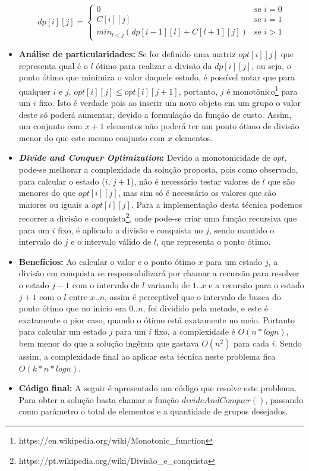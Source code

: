 \begin{itemize}
\begin{equation}
dp[i][j] =
\begin{cases}
0 &\text{se } i = 0 \\
C[i][j] &\text{se } i = 1 \\
min_{l < j}(dp[i-1][l] + C[l+1][j]) &\text{se } i > 1
\end{cases}
\label{eq:dc1}
\end{equation}

\item \textbf{Análise de particularidades:} 
Se for definido uma matriz $opt[i][j]$ que representa qual é o $l$ ótimo para realizar a divisão da $dp[i][j]$, ou seja, o ponto ótimo que minimiza o valor daquele estado, é possível notar que para qualquer $i$ e $j$, $opt[i][j] \leq opt[i][j+1]$, portanto, $j$ é monotônico\footnote{https://en.wikipedia.org/wiki/Monotonic\_function} para um $i$ fixo. Isto é verdade pois ao inserir um novo objeto em um grupo o valor deste só poderá aumentar, devido a formulação da função de custo. Assim, um conjunto com $x+1$ elementos não poderá ter um ponto ótimo de divisão menor do que este mesmo conjunto com $x$ elementos.

\item \textbf{\textit{Divide and Conquer Optimization}:} Devido a monotonicidade de $opt$, pode-se melhorar a complexidade da solução proposta, pois como observado, para calcular o estado ($i$, $j+1$), não é necessário testar valores de $l$ que são menores do que $opt[i][j]$, mas sim só é necessário os valores que são maiores ou iguais a $opt[i][j]$. Para a implementação desta técnica podemos recorrer a divisão e conquista\footnote{https://pt.wikipedia.org/wiki/Divisão\_e\_conquista}, onde pode-se criar uma função recursiva que para um $i$ fixo, é aplicado a divisão e conquista no $j$, sendo mantido o intervalo do $j$ e o intervalo válido de $l$, que representa o ponto ótimo.

\item \textbf{Benefícios:} Ao calcular o valor e o ponto ótimo $x$ para um estado $j$, a divisão em conquista se responsabilizará por chamar a recursão para resolver o estado $j-1$ com o intervalo de $l$ variando de $1..x$ e a recursão para o estado $j+1$ com o $l$ entre $x..n$, assim é perceptível que o intervalo de busca do ponto ótimo que no início era $0..n$, foi dividido pela metade, e este é exatamente o pior caso, quando o ótimo está exatamente no meio. Portanto para calcular um estado $j$ para um $i$ fixo, a complexidade é $O(n*logn)$, bem menor do que a solução ingênua que gastava $O(n^2)$ para cada $i$. Sendo assim, a complexidade final ao aplicar esta técnica neste problema fica $O(k*n*logn)$.
\item \textbf{Código final:} A seguir é apresentado um código que resolve este problema. Para obter a solução basta chamar a função $divideAndConquer()$, passando como parâmetro o total de elementos e a quantidade de grupos desejados.
\\


\end{itemize}
